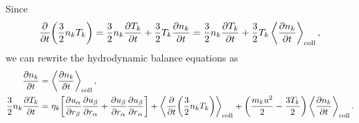 \documentclass[aps,prl,preprint,groupedaddress,10pt]{revtex4-2}
\begin{document}
Since
\begin{equation}
    \pdv{t}\pqty{\frac{3}{2}n_kT_k}=\frac{3}{2}n_k\pdv{T_k}{t}+
    \frac{3}{2}T_k\pdv{n_k}{t}=\frac{3}{2}n_k\pdv{T_k}{t}+
    \frac{3}{2}T_k\ltx{\avg{\pdv{n_k}{t}}}{coll},
\end{equation}
we can rewrite the hydrodynamic balance equations as
\begin{equation}
    \begin{split}
        \pdv{n_k}{t} &= \ltx{\avg{\pdv{n_k}{t}}}{coll},\\
        \frac{3}{2}n_k\pdv{T_k}{t} &=
        \eta_k\bqty{\pdv{\ia{u}}{\ib{r}}\pdv{\ib{u}}{\ia{r}}+
            \pdv{\ib{u}}{\ia{r}}\pdv{\ib{u}}{\ia{r}}}+
        \ltx{\avg{\pdv{t}\pqty{\frac{3}{2}n_kT_k}}}{coll}+
        \pqty{\frac{m_ku^2}{2}-\frac{3T_k}{2}}\ltx{\avg{\pdv{n_k}{t}}}{coll}.
    \end{split}
\end{equation}
\end{document}
